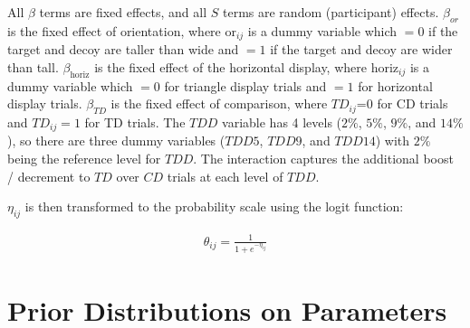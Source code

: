 All $\beta$ terms are fixed effects, and all $S$ terms are random (participant) effects. $\beta_{or}$ is the fixed effect of orientation, where $\text{or}_{ij}$ is a dummy variable which $=0$ if the target and decoy are taller than wide and $=1$ if the target and decoy are wider than tall. $\beta_{\mathrm{horiz}}$ is the fixed effect of the horizontal display, where $\mathrm{horiz}_{ij}$ is a dummy variable which $=0$ for triangle display trials and $=1$ for horizontal display trials. $\beta_{TD}$ is the fixed effect of comparison, where $TD_{ij}$=0 for CD trials and $TD_{ij}=1$ for TD trials.  The $TDD$ variable has 4 levels ($2\%$, $5\%$, $9\%$, and $14\%$), so there are three dummy variables ($TDD5$, $TDD9$, and $TDD14$) with $2\%$ being the reference level for $TDD$. The interaction captures the additional boost / decrement to $TD$ over $CD$ trials at each level of $TDD$. 

$\eta_{ij}$ is then transformed to the probability scale using the logit function:

\begin{align*}
    \theta_{ij}=\frac{1}{1+e^{-\eta_{ij}}}
\end{align*}

\section{Prior Distributions on Parameters}

